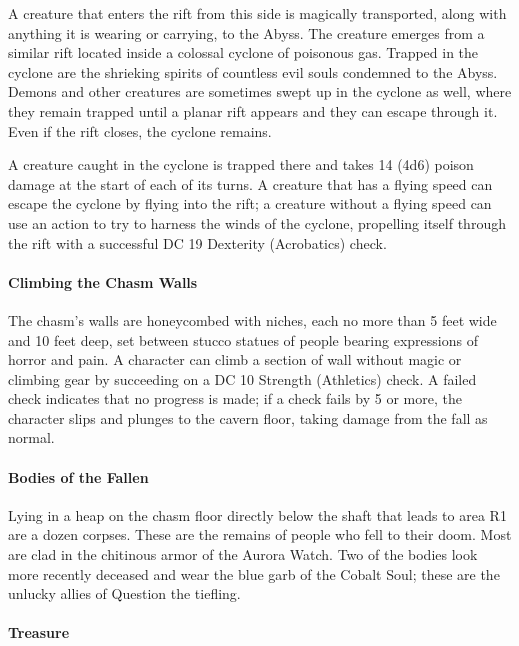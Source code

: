 \documentclass[a4paper, 11pt, bg=full, twocolumn, nooutline]{dndbook}
\begin{document}
A creature that enters the rift from this side is magically transported, along with anything it is wearing or carrying, to the Abyss. The creature emerges from a similar rift located inside a colossal cyclone of poisonous gas. Trapped in the cyclone are the shrieking spirits of countless evil souls condemned to the Abyss. Demons and other creatures are sometimes swept up in the cyclone as well, where they remain trapped until a planar rift appears and they can escape through it. Even if the rift closes, the cyclone remains.

A creature caught in the cyclone is trapped there and takes 14 (4d6) poison damage at the start of each of its turns. A creature that has a flying speed can escape the cyclone by flying into the rift; a creature without a flying speed can use an action to try to harness the winds of the cyclone, propelling itself through the rift with a successful DC 19 Dexterity (Acrobatics) check.

\paragraph{Climbing the Chasm Walls}

The chasm's walls are honeycombed with niches, each no more than 5 feet wide and 10 feet deep, set between stucco statues of people bearing expressions of horror and pain. A character can climb a section of wall without magic or climbing gear by succeeding on a DC 10 Strength (Athletics) check. A failed check indicates that no progress is made; if a check fails by 5 or more, the character slips and plunges to the cavern floor, taking damage from the fall as normal.

\paragraph{Bodies of the Fallen}

Lying in a heap on the chasm floor directly below the shaft that leads to area R1 are a dozen corpses. These are the remains of people who fell to their doom. Most are clad in the chitinous armor of the Aurora Watch. Two of the bodies look more recently deceased and wear the blue garb of the Cobalt Soul; these are the unlucky allies of Question the tiefling.

\paragraph{Treasure}
\end{document}
